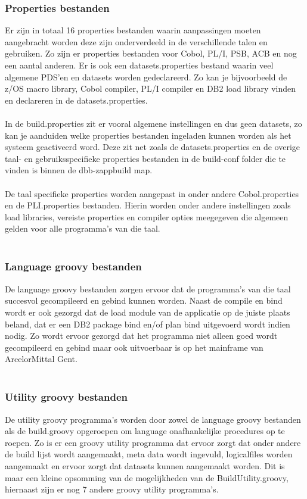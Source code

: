 \subsubsection{Properties bestanden}
Er zijn in totaal 16 properties bestanden waarin aanpassingen moeten aangebracht worden deze zijn onderverdeeld in de verschillende talen en gebruiken. Zo zijn er properties bestanden voor Cobol, PL/I, PSB, ACB en nog een aantal anderen. Er is ook een datasets.properties bestand waarin veel algemene PDS'en en datasets worden gedeclareerd. Zo kan je bijvoorbeeld de z/OS macro library, Cobol compiler, PL/I compiler en DB2 load library vinden en declareren in de datasets.properties. 
\\ \\
In de build.properties zit er vooral algemene instellingen en dus geen datasets, zo kan je aanduiden welke properties bestanden ingeladen kunnen worden als het systeem geactiveerd word. Deze zit net zoals de datasets.properties en de overige taal- en gebruiksspecifieke properties bestanden in de build-conf folder die te vinden is binnen de dbb-zappbuild map. 
\\ \\
De taal specifieke properties worden aangepast in onder andere Cobol.properties en de PLI.properties bestanden. Hierin worden onder andere instellingen zoals load libraries, vereiste properties en compiler opties meegegeven die algemeen gelden voor alle programma's van die taal. 
\\ \\
\subsubsection{Language groovy bestanden}
De language groovy bestanden zorgen ervoor dat de programma's van die taal succesvol gecompileerd en gebind kunnen worden. Naast de compile en bind wordt er ook gezorgd dat de load module van de applicatie op de juiste plaats beland, dat er een DB2 package bind en/of plan bind uitgevoerd wordt indien nodig. Zo wordt ervoor gezorgd dat het programma niet alleen goed wordt gecompileerd en gebind maar ook uitvoerbaar is op het mainframe van ArcelorMittal Gent. 
\\ \\
\subsubsection{Utility groovy bestanden}
De utility groovy programma's worden door zowel de language groovy bestanden als de build.groovy opgeroepen om language onafhankelijke procedures op te roepen. Zo is er een groovy utility programma dat ervoor zorgt dat onder andere de build lijst wordt aangemaakt, meta data wordt ingevuld, logicalfiles worden aangemaakt en ervoor zorgt dat datasets kunnen aangemaakt worden. Dit is maar een kleine opsomming van de mogelijkheden van de BuildUtility.groovy, hiernaast zijn er nog 7 andere groovy utility programma's.
\\ \\
